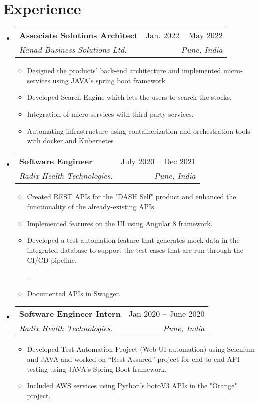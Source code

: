 \documentclass[letterpaper,11pt]{article}
\makeatletter
\newcommand{\resumeItem}[1]{
  \item\small{
    {#1 \vspace{-2pt}}
  }
}
\newcommand{\resumeSubheading}[4]{
  \vspace{-2pt}\item
    \begin{tabular*}{0.97\textwidth}[t]{l@{\extracolsep{\fill}}r}
      \textbf{#1} & #2 \\
      \textit{\small#3} & \textit{\small #4} \\
    \end{tabular*}\vspace{-7pt}
}
\newcommand{\resumeSubSubheading}[2]{
    \item
    \begin{tabular*}{0.97\textwidth}{l@{\extracolsep{\fill}}r}
      \textit{\small#1} & \textit{\small #2} \\
    \end{tabular*}\vspace{-7pt}
}
\newcommand{\resumeSubHeadingListStart}{\begin{itemize}[leftmargin=0.15in, label={}]}
\newcommand{\resumeSubHeadingListEnd}{\end{itemize}}
\newcommand{\resumeItemListStart}{\begin{itemize}}
\newcommand{\resumeItemListEnd}{\end{itemize}\vspace{-5pt}}
\makeatother
\begin{document}
\section{Experience}
  \resumeSubHeadingListStart


    \resumeSubheading
      {Associate Solutions Architect}{Jan. 2022 -- May 2022}
      {Kanad Business Solutions Ltd.}{Pune, India}
      \resumeItemListStart
        \resumeItem{Designed the products' back-end architecture and implemented micro-services using JAVA’s spring boot framework}
        \resumeItem{Developed Search Engine which lets the users to search the stocks.}
        \resumeItem{Integration of micro services with third party services.}
        \resumeItem{Automating infrastructure using containerization and orchestration tools with docker and Kubernetes}
    \resumeItemListEnd

    \resumeSubheading
      {Software Engineer}{July 2020 -- Dec 2021}
      {Radix Health Technologies.}{Pune, India}
      \resumeItemListStart
        \resumeItem{Created REST APIs for the "DASH Self" product and enhanced the functionality of the already-existing APIs.}
        \resumeItem{Implemented features on the UI using Angular 8 framework.}
        \resumeItem{Developed a test automation feature that generates mock data in the integrated database to support the test cases that are run through the CI/CD pipeline.}
        .\resumeItem{Documented APIs in Swagger.
        }
    \resumeItemListEnd  
    
    \resumeSubheading
      {Software Engineer Intern}{Jan 2020 -- June 2020}
      {Radix Health Technologies.}{Pune, India}
      \resumeItemListStart
        \resumeItem{Developed Test Automation Project (Web UI automation) using Selenium and JAVA and worked on “Rest Assured” project for end-to-end API testing using JAVA’s Spring Boot framework.}
        \resumeItem{Included AWS services using Python's botoV3 APIs in the "Orange" project.}
    \resumeItemListEnd

  \resumeSubHeadingListEnd
\end{document}
